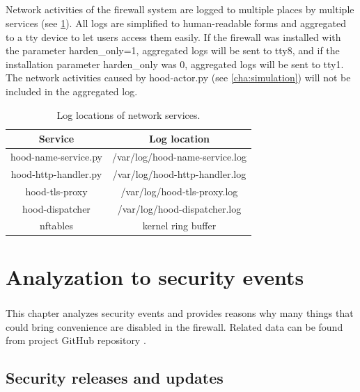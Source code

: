 \documentclass[mscthesis]{usiinfthesis}
\begin{document}
\paragraph{}
Network activities of the firewall system are logged to multiple places by multiple services (see \cref{tab:network_log}). All logs are simplified to human-readable forms and aggregated to a tty device to let users access them easily. If the firewall was installed with the parameter harden\_only=1, aggregated logs will be sent to tty8, and if the installation parameter harden\_only was 0, aggregated logs will be sent to tty1. The network activities caused by hood-actor.py (see \cref{cha:simulation}) will not be included in the aggregated log.
\begin{table}[H]
  \centering
  \begin{tabular}{|c|c|}
    \hline
    Service              & Log location                   \\
    \hline
    hood-name-service.py & /var/log/hood-name-service.log \\
    hood-http-handler.py & /var/log/hood-http-handler.log \\
    hood-tls-proxy       & /var/log/hood-tls-proxy.log    \\
    hood-dispatcher      & /var/log/hood-dispatcher.log   \\
    nftables             & kernel ring buffer             \\
    \hline
  \end{tabular}
  \caption{Log locations of network services.}
  \label{tab:network_log}
\end{table}



\chapter{Analyzation to security events}\label{cha:events}
\paragraph{}
This chapter analyzes security events and provides reasons why many things that could bring convenience are disabled in the firewall. Related data can be found from project GitHub repository \citep{hood:github}.

\section{Security releases and updates}
\end{document}
